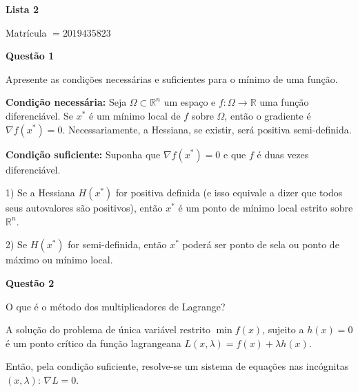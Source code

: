 \documentclass{rbfin}
\begin{document}
\rbfe{}

\begin{center}
\Large

\textbf{Lista 2}

\normalsize

Matrícula $= 2019435823$
\end{center}

\large

\textbf{Questão 1}

\normalsize

\vspace{6mm}

\doublespacing

Apresente as condições necessárias e suficientes para o mínimo de uma função.

\textbf{Condição necessária:} Seja $\Omega \subset \mathbb{R}^n$ um espaço e $f : \Omega \to \mathbb{R}$ uma função diferenciável. Se $x^*$ é um mínimo local de $f$ sobre $\Omega$, então o gradiente é $\nabla f(x^*) = 0$. Necessariamente, a Hessiana, se existir, será positiva semi-definida.

\textbf{Condição suficiente:} Suponha que $\nabla f(x^*) = 0$ e que $f$ é duas vezes diferenciável. 

1) Se a Hessiana $H(x^*)$ for positiva definida (e isso equivale a dizer que todos seus autovalores são positivos), então $x^*$ é um ponto de mínimo local estrito sobre $\mathbb{R}^n$.

2) Se $H(x^*)$ for semi-definida, então $x^*$ poderá ser ponto de sela ou ponto de máximo ou mínimo local.

\singlespacing

\vspace{6mm}

\large

\textbf{Questão 2} 

\normalsize

\vspace{6mm}

\doublespacing

O que é o método dos multiplicadores de Lagrange?

A solução do problema de única variável restrito $\min f(x)$, sujeito a $h(x) = 0$ é um ponto crítico da função lagrangeana $L(x, \lambda) = f(x) + \lambda h(x)$.

Então, pela condição suficiente, resolve-se um sistema de equações nas incógnitas $(x,\lambda)$: $\nabla L = 0$.
\end{document}
